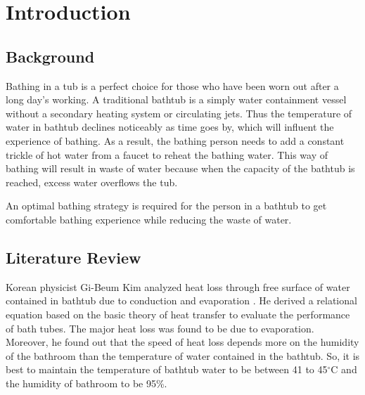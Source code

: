 \documentclass{mcmthesis}
\renewcommand{\contentsname}{\hspace*{\fill}\Large\bfseries Contents \hspace*{\fill}}
\begin{document}
\maketitle

\tableofcontents        %
\thispagestyle{empty}

\newpage

\section{Introduction}

\subsection{Background}

Bathing in a tub is a perfect choice for those who have been worn out after a long day's working. A traditional bathtub is a simply water containment vessel without a secondary heating system or circulating jets. Thus the temperature of water in bathtub declines noticeably as time goes by, which will influent the experience of bathing. As a result, the bathing person needs to add a constant trickle of hot water from a faucet to reheat the bathing water. This way of bathing will result in waste of water because when the capacity of the bathtub is reached, excess water overflows the tub.

An optimal bathing strategy is required for the person in a bathtub to get comfortable bathing experience while reducing the waste of water.

\subsection{Literature Review}

Korean physicist Gi-Beum Kim analyzed heat loss through free surface of water contained in bathtub due to conduction and evaporation \cite{1}. He derived a relational equation based on the basic theory of heat transfer to evaluate the performance of bath tubes. The major heat loss was found to be due to evaporation. Moreover, he found out that the speed of heat loss depends more on the humidity of the bathroom than the temperature of water contained in the bathtub. So, it is best to maintain the temperature of bathtub water to be between 41 to 45$^{\circ}$C and the humidity of bathroom to be 95\%.
\end{document}
